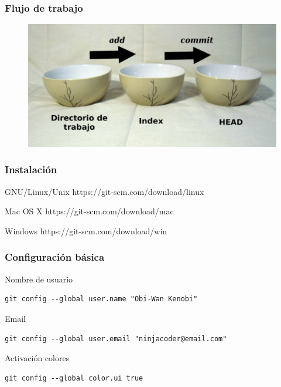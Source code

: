 \documentclass{beamer}
\begin{document}
\begin{frame}
\frametitle{Flujo de trabajo}
\begin{figure}
\includegraphics[width=0.8\linewidth]{cuencos.png}
\end{figure}
\end{frame}

\begin{frame}
\frametitle{Instalación}
\begin{block}{GNU/Linux/Unix}
https://git-scm.com/download/linux
\end{block}
\vskip 0.50cm
\begin{block}{Mac OS X}
https://git-scm.com/download/mac
\end{block}
\vskip 0.50cm
\begin{block}{Windows}
https://git-scm.com/download/win
\end{block}
\end{frame}

\begin{frame}[fragile]
\frametitle{Configuración básica}
\begin{block}{Nombre de usuario}
\begin{verbatim}
git config --global user.name "Obi-Wan Kenobi"
\end{verbatim}
\end{block}
\begin{block}{Email}
\begin{verbatim}
git config --global user.email "ninjacoder@email.com"
\end{verbatim}
\end{block}
\begin{block}{Activación colores}
\begin{verbatim}
git config --global color.ui true
\end{verbatim}
\end{block}
\end{frame}
\end{document}
